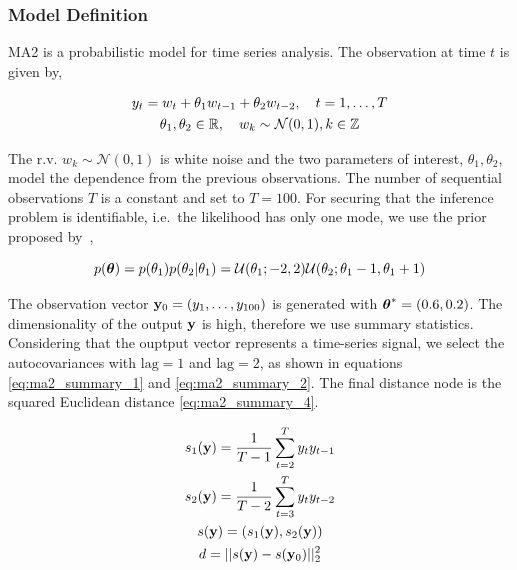 \subsubsection*{Model Definition}

MA2 is a probabilistic model for time series analysis. The observation
at time \(t\) is given by,

\begin{gather} \label{eq:ma2}
y_t = w_t + \theta_1 w_{t-1} + \theta_2 w_{t-2}, \quad t=1, \ldots, T\\
\theta_1, \theta_2 \in \mathbb{R}, \quad  w_k \sim \mathcal{N}(0,1), k \in \mathbb{Z}
\end{gather}

\noindent
The r.v. \(w_{k} \sim \mathcal{N}(0,1) \) is white noise and the two
parameters of interest, \(\theta_1, \theta_2\), model the dependence
from the previous observations. The number of sequential observations
\(T\) is a constant and set to \(T=100\). For securing
that the inference problem is identifiable, i.e.\ the likelihood has
only one mode, we use the prior proposed by~\cite{Marin2012},

\begin{equation} \label{eq:ma2_prior}
p(\boldsymbol{\theta}) = p(\theta_1)p(\theta_2|\theta_1)
= \mathcal{U}(\theta_1;-2,2)\mathcal{U}(\theta_2;\theta_1-1, \theta_1+1)
\end{equation}


\noindent
The observation vector \(\mathbf{y}_0 = (y_1, \ldots, y_{100})\) is generated
with \(\boldsymbol{\theta}^*=(0.6, 0.2)\). The dimensionality of the output
\(\mathbf{y}\) is high, therefore we use summary statistics. Considering that
the ouptput vector represents a time-series signal, we select the
autocovariances with \(\mathrm{lag}=1\) and \(\mathrm{lag}=2\), as shown in equations
\eqref{eq:ma2_summary_1} and \eqref{eq:ma2_summary_2}. The final
distance node is the squared Euclidean distance
\eqref{eq:ma2_summary_4}.

\begin{gather} \label{eq:ma2_summary_1}
  s_1(\mathbf{y}) = \frac{1}{T-1} \sum_{t=2}^T y_ty_{t-1}\\ \label{eq:ma2_summary_2}
  s_2(\mathbf{y}) = \frac{1}{T-2} \sum_{t=3}^T y_ty_{t-2} \\
  s(\mathbf{y}) = (s_1(\mathbf{y}), s_2(\mathbf{y}))\\ \label{eq:ma2_summary_4}
  d = ||s(\mathbf{y}) - s(\mathbf{y}_0)||_2^2 
\end{gather}

